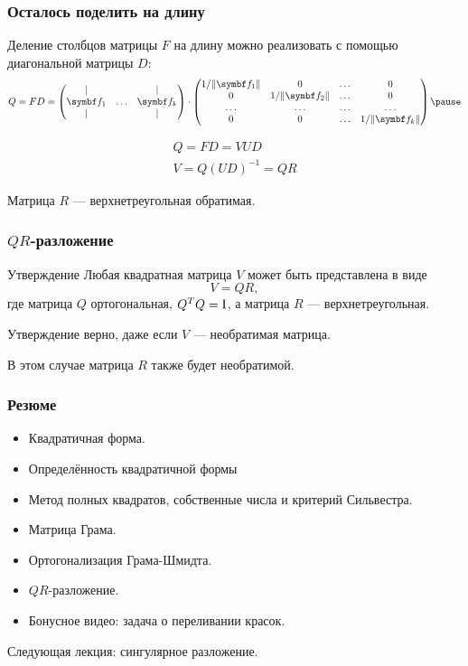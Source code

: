 \begin{frame}
    \frametitle{Осталось поделить на длину}

    Деление столбцов матрицы $F$ на длину можно реализовать с помощью диагональной матрицы $D$: \pause
    \[
    Q = F D  = \begin{pmatrix}
        \vert &  & \vert \\
        \bff_1 & \ldots & \bff_k \\
        \vert &  & \vert \\
    \end{pmatrix}  \cdot \begin{pmatrix}
        1/ \norm{\bff_1} & 0 & \ldots & 0 \\
0 & 1/ \norm{\bff_2} & \ldots & 0 \\
\ldots & \ldots & \ldots & \ldots \\
0 & 0 & \ldots & 1/ \norm{\bff_k} \\
    \end{pmatrix} \pause
    \]

    \[
    \begin{array}{l}
    Q = FD = VUD \\
    V = Q(UD)^{-1} = QR
    \end{array}
    \]
    
    Матрица $R$ — верхнетреугольная обратимая.


\end{frame}


\begin{frame}
    \frametitle{$QR$-разложение}

    \begin{block}{Утверждение}
        Любая квадратная матрица $V$ может быть представлена в виде
        \[
        V = QR, 
        \]
        где матрица $Q$ ортогональная, $Q^T Q= \mathrm{I}$, а матрица $R$ — верхнетреугольная. \pause
    \end{block}
    
    Утверждение верно, даже если $V$ — необратимая матрица.

    В этом случае матрица $R$ также будет необратимой.

\end{frame}


\begin{frame}
    \frametitle{Резюме}

    \begin{itemize}[<+->]
    \item Квадратичная форма.
    \item Определённость квадратичной формы
    \item Метод полных квадратов, собственные числа и критерий Сильвестра.
    \item Матрица Грама.
    \item Ортогонализация Грама-Шмидта.
    \item $QR$-разложение.
    \item Бонусное видео: задача о переливании красок.
    \end{itemize}
    \pause
    \alert{Следующая лекция:} сингулярное разложение.
        


\end{frame}